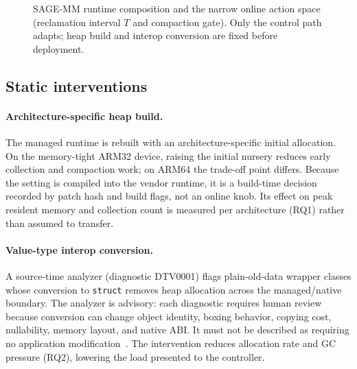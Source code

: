 \documentclass[acmsmall,screen]{acmart}
\begin{document}
\begin{figure}[t]
  \centering
  \setlength{\fboxsep}{7pt}%
  \caption{SAGE-MM runtime composition and the narrow online action space
  (reclamation interval $T$ and compaction gate). Only the control path
  adapts; heap build and interop conversion are fixed before deployment.}
  \label{fig:arch}
\end{figure}

\subsection{Static interventions}
\label{sec:static}

\paragraph{Architecture-specific heap build.}
The managed runtime is rebuilt with an architecture-specific initial
allocation. On the memory-tight ARM32 device, raising the initial nursery
reduces early collection and compaction work; on ARM64 the trade-off point
differs. Because the setting is compiled into the vendor runtime, it is a
build-time decision recorded by patch hash and build flags, not an online
knob. Its effect on peak resident memory and collection count is measured
per architecture (RQ1) rather than assumed to transfer.

\paragraph{Value-type interop conversion.}
A source-time analyzer (diagnostic \textsf{DTV0001}) flags plain-old-data
wrapper classes whose conversion to \texttt{struct} removes heap allocation
across the managed/native boundary. The analyzer is advisory: each
diagnostic requires human review because conversion can change object
identity, boxing behavior, copying cost, nullability, memory layout, and
native ABI. It must not be described as requiring no application
modification~\cite{dotnetinterop}. The intervention reduces allocation rate
and GC pressure
(RQ2), lowering the load presented to the controller.
\end{document}
